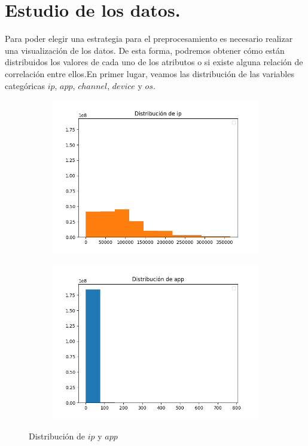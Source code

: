 \chapter[Estudio de los datos.]{Estudio de los datos.}
Para poder elegir una estrategia para el preprocesamiento es necesario realizar una visualización de los datos. De esta forma, podremos obtener cómo están distribuidos los valores de cada uno de los atributos o si existe alguna relación de correlación entre ellos.En primer lugar, veamos las distribución de las variables categóricas $ip$, $app$, $channel$, $device$ y $os$.
\begin{figure}[H]
	\centering
	\begin{subfigure}{.5\textwidth}
		\centering
		\includegraphics[scale=0.5]{img/ip_distribution.png}
	\end{subfigure}%
	\begin{subfigure}{.5\textwidth}
		\centering
		\includegraphics[scale=0.5]{img/app_distribution.png}
	\end{subfigure}
	\caption{Distribución de $ip$ y $app$}
\end{figure}
